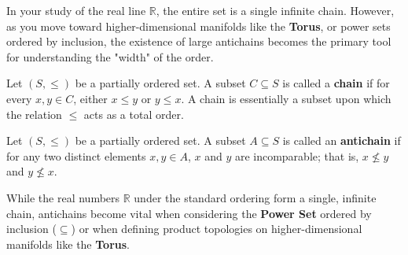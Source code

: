 \begin{remark}
In your study of the real line $\mathbb{R}$, the entire set is a single infinite chain. However, as you move toward higher-dimensional manifolds like the \textbf{Torus}, or power sets ordered by inclusion, the existence of large antichains becomes the primary tool for understanding the "width" of the order.
\end{remark}



\begin{definition}[Chain]
Let $(S, \le)$ be a partially ordered set. A subset $C \subseteq S$ is called a \textbf{chain} if for every $x, y \in C$, either $x \le y$ or $y \le x$. A chain is essentially a subset upon which the relation $\le$ acts as a total order.
\end{definition}

\begin{definition}[Antichain]
Let $(S, \le)$ be a partially ordered set. A subset $A \subseteq S$ is called an \textbf{antichain} if for any two distinct elements $x, y \in A$, $x$ and $y$ are incomparable; that is, $x \not\le y$ and $y \not\le x$.
\end{definition}

\begin{remark}
While the real numbers $\mathbb{R}$ under the standard ordering form a single, infinite chain, antichains become vital when considering the \textbf{Power Set} ordered by inclusion ($\subseteq$) or when defining product topologies on higher-dimensional manifolds like the \textbf{Torus}.
\end{remark}